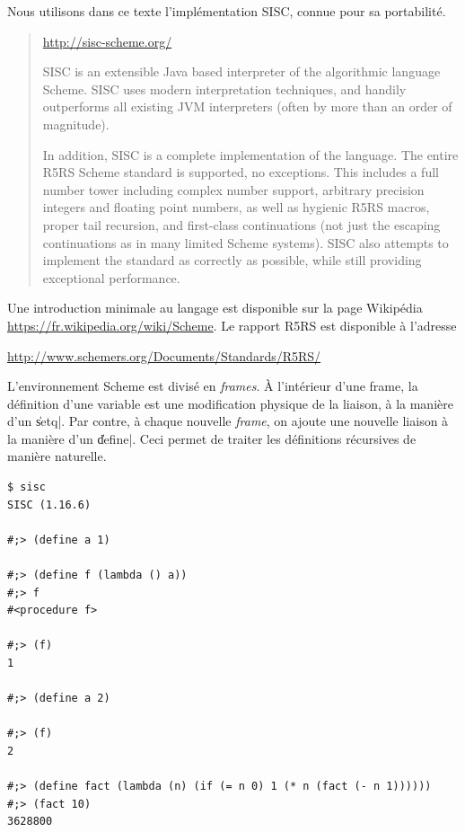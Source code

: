 \documentclass{../../LaTeX/tdsimple}
\begin{document}
\begin{attention}
  Nous utilisons dans ce texte l'implémentation SISC, connue pour sa
  portabilité.
  \begin{quotation}
    \url{http://sisc-scheme.org/}
   
    SISC is an extensible Java based interpreter of the algorithmic
    language Scheme. SISC uses modern interpretation techniques, and
    handily outperforms all existing JVM interpreters (often by more
    than an order of magnitude).

    In addition, SISC is a complete implementation of the
    language. The entire R5RS Scheme standard is supported, no
    exceptions. This includes a full number tower including complex
    number support, arbitrary precision integers and floating point
    numbers, as well as hygienic R5RS macros, proper tail recursion,
    and first-class continuations (not just the escaping continuations
    as in many limited Scheme systems). SISC also attempts to
    implement the standard as correctly as possible, while still
    providing exceptional performance.
  \end{quotation}
\end{attention}

Une introduction minimale au langage est disponible sur la page
Wikipédia \url{https://fr.wikipedia.org/wiki/Scheme}. Le rapport R5RS
est disponible à l'adresse
\begin{center}
  \url{http://www.schemers.org/Documents/Standards/R5RS/}
\end{center}


L'environnement Scheme est divisé en \emph{frames}. À l'intérieur
d'une frame, la définition d'une variable est une modification
physique de la liaison, à la manière d'un \|setq|. Par contre, à
chaque nouvelle \emph{frame}, on ajoute une nouvelle liaison à la
manière d'un \|define|. Ceci permet de traiter les définitions
récursives de manière naturelle.
\begin{lstlisting}
$ sisc
SISC (1.16.6)

#;> (define a 1)

#;> (define f (lambda () a))
#;> f
#<procedure f>

#;> (f)
1

#;> (define a 2)

#;> (f)
2

#;> (define fact (lambda (n) (if (= n 0) 1 (* n (fact (- n 1))))))
#;> (fact 10)
3628800
\end{lstlisting}
\end{document}
